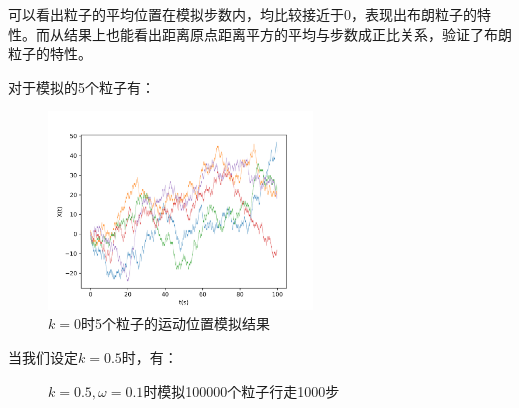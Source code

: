 \documentclass[a4paper,11pt]{article}
\begin{document}
可以看出粒子的平均位置在模拟步数内，均比较接近于0，表现出布朗粒子的特性。而从结果上也能看出距离原点距离平方的平均与步数成正比关系，验证了布朗粒子的特性。

对于模拟的5个粒子有：
\begin{figure}[!htbp]
\centering
\includegraphics[width=7cm]{w=1/k=0,w=1.png}    	
\caption{$k=0$时5个粒子的运动位置模拟结果}
\end{figure}

当我们设定$k=0.5$时，有：


\begin{figure}[!htbp]   
\centering     
{}
\caption{$k=0.5,\omega=0.1$时模拟100000个粒子行走1000步}      
\end{figure}
\end{document}
